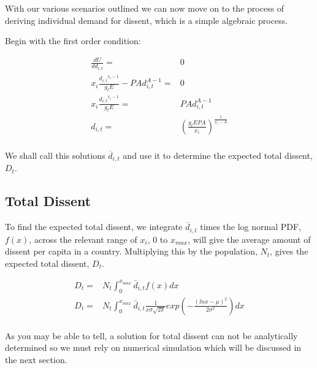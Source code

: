 \documentclass[12pt]{article}
\begin{document}
\begin{spacing}{1.5}
With our various scenarios outlined we can now move on to the process of deriving individual demand for dissent, which is a simple algebraic process. 

\vspace{1 em}
\noindent Begin with the first order condition: 

\begin{equation}
	\begin{aligned}
\frac{dU}{dd_{i,t}}=& 0\\ 
x_i \frac{{d_{i,t}}^{x_i -1}}{g_t E} - PAd_{i,t}^{A-1}=& 0 \\
	x_i \frac{{d_{i,t}}^{x_i -1}}{g_t E} =& PAd_{i,t}^{A-1}\\
		d_{i,t}=& \left(\frac{g_tEPA}{x_i} \right)^{\frac{1}{x_i -A}}\\ 	
	\end{aligned}
\end{equation}

We shall call this solutions $\overline{d}_{i,t}$ and use it to determine the expected total dissent, $D_t$. 

   
\subsection{Total Dissent}
 
To find the expected total dissent, we integrate $\overline{d}_{i,t}$ times the log normal PDF, $f(x)$, across the relevant range of $x_i$, $0$ to $x_{max}$, will give the average amount of dissent per capita in a country. Multiplying this by the population, $N_t$, gives the expected total dissent, $D_t$.

\begin{equation}
	\begin{aligned}
D_t=& N_t \int_{0}^{x_{max}} \bar{d}_{i,t} f(x) dx \\	
D_t	=& N_t \int_{0}^{x_{max}} \bar{d}_{i,t} \frac{1}{x\sigma \sqrt{2\pi}}exp  \left( -\frac{(lnx-\mu)^2}{2\sigma^2} \right)  dx \\	
	\end{aligned}
\end{equation}

As you may be able to tell, a solution for total dissent can not be analytically determined so we must rely on numerical simulation which will be discussed in the next section. 


\end{spacing}
\end{document}
